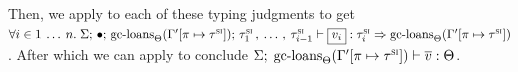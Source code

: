 \begin{preservation}
{    Then, we apply  to each of these
    typing judgments to get $\forall i \in 1 \oxdots n. \;
    \oxtypjudge{\oxglobalctx}{\oxemptyctx}{\oxsitype_1 \oxdotsc \oxsitype_{i-1}}{
      \oxgcloans{\oxkontctx}{\oxtupdate{\oxvarctx^\prime}{\oxplace}{\oxsitype}}
    }{
      \oxvalue_i
    }{\oxsitype_i}{
      \oxgcloans{\oxkontctx}{\oxtupdate{\oxvarctx^\prime}{\oxplace}{\oxsitype}}
    }$. After which we can apply  to conclude
    $\Sigma; \; 
      \textrm{gc-loans}_{\Theta}(\Gamma^\prime [\pi \mapsto \tau^\textsc{si}])
     \vdash \overline{v} : \Theta$.
  }



\end{preservation}


